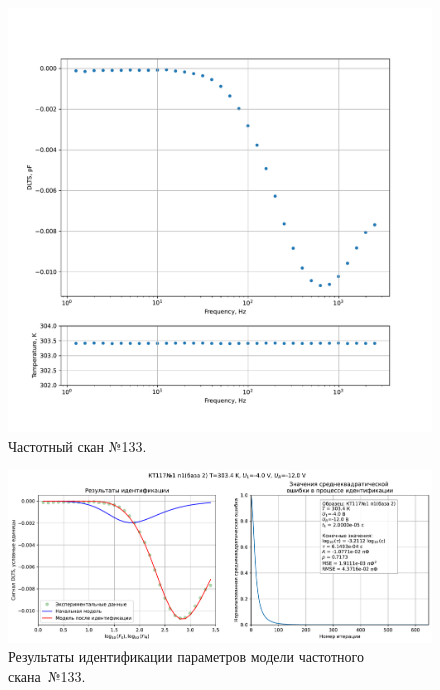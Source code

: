 \begin{figure}[!ht]
    \centering
    \includegraphics[width=1\textwidth]{../plots/КТ117№1_п1(база 2)_2500Гц-1Гц_1пФ_+30С_-4В-12В_200мВ_20мкс_шаг_0,1.pdf}
    \caption{Частотный скан №133.}
    \label{pic:frequency_scan_133}
\end{figure}

\begin{figure}[!ht]
    \centering
    \includegraphics[width=1\textwidth]{../plots/КТ117№1_п1(база 2)_2500Гц-1Гц_1пФ_+30С_-4В-12В_200мВ_20мкс_шаг_0,1_model.pdf}
    \caption{Результаты идентификации параметров модели частотного скана~№133.}
    \label{pic:frequency_scan_model133}
\end{figure}

\pagebreak


